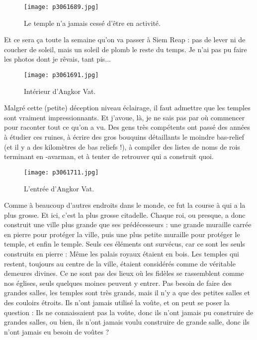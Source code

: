 \documentclass{book}
\begin{document}
\begin{figure}[h]
\centering
\texttt{[image: p3061689.jpg]}
\caption*{Le temple n'a jamais cessé d'être en activité.}
\end{figure}

Et ce sera ça toute la semaine qu'on va passer à Siem Reap :  pas de lever ni de coucher de soleil, mais un soleil de plomb le reste du temps. Je n'ai pas pu faire les photos dont je rêvais, tant pis...


\begin{figure}[h]
\centering
\texttt{[image: p3061691.jpg]}
\caption*{Intérieur d'Angkor Vat.}
\end{figure}

Malgré cette (petite) déception niveau éclairage, il faut admettre que les temples sont vraiment impressionnants. Et j'avoue, là, je ne sais pas par où commencer pour raconter tout ce qu'on a vu. Des gens très compétents ont passé des années à étudier ces ruines, à écrire des gros bouquins détaillants le moindre bas-relief (et il y a des kilomètres de bas reliefs !), à compiler des listes de noms de rois terminant en -avarman, et à tenter de retrouver qui a construit quoi.


\begin{figure}[h]
\centering
\texttt{[image: p3061711.jpg]}
\caption*{L'entrée d'Angkor Vat.}
\end{figure}

Comme à beaucoup d'autres endroits dans le monde, ce fut la course à qui a la plus grosse. Et ici, c'est la plus grosse citadelle. Chaque roi, ou presque, a donc construit une ville plus grande que ses prédécesseurs : une grande muraille carrée en pierre pour protéger la ville, puis une plus petite muraille pour protéger le temple, et enfin le temple. Seuls ces éléments ont survécus, car ce sont les seuls construits en pierre : Même les palais royaux étaient en bois. Les temples qui restent, toujours au centre de la ville, étaient considérés comme de véritable demeures divines. Ce ne sont pas des lieux où les fidèles se rassemblent comme nos églises, seuls quelques moines peuvent y entrer. Pas besoin de faire des grandes salles, les temples sont très grands, mais il n'y a que des petites salles et des couloirs étroits. Ils n'ont jamais utilisé la voûte, et on peut se poser la question : Ils ne connaissaient pas la voûte, donc ils n'ont jamais pu construire de grandes salles, ou bien, ils n'ont jamais voulu construire de grande salle, donc ils n'ont jamais eu besoin de voûtes ?
\end{document}
